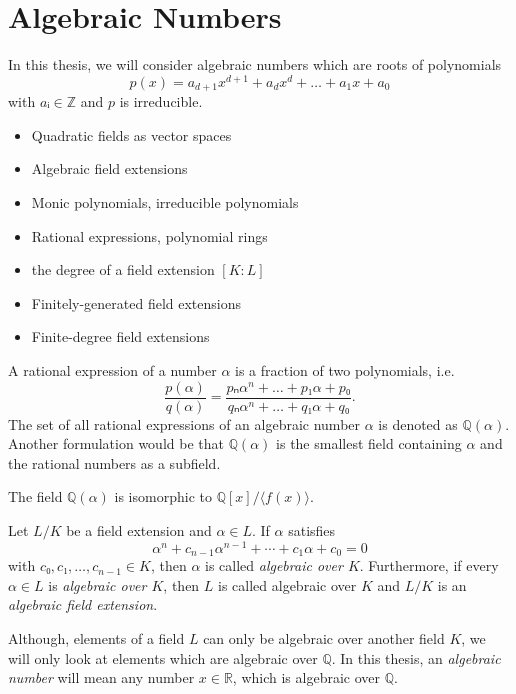 
\section{Algebraic Numbers}

In this thesis, we will consider algebraic numbers which are roots of polynomials
\[
  p(x) = a_{d+1} x^{d+1} + a_d x^d + \dots + a_1 x + a_0
\]
with $aᵢ ∈ ℤ$ and $p$ is irreducible.

\begin{itemize}
  \item Quadratic fields as vector spaces
  \item Algebraic field extensions
  \item Monic polynomials, irreducible polynomials
  \item Rational expressions, polynomial rings
  \item the degree of a field extension $[K : L]$
  \item Finitely-generated field extensions
  \item Finite-degree field extensions
\end{itemize}

A rational expression of a number $α$ is a fraction of two polynomials, i.e.
\[
  \frac{p(α)}{q(α)} = \frac{pₙ α^n + \dots + p₁ α + p₀}{qₙ α^n + \dots + q₁ α + q₀}.
\]
The set of all rational expressions of an algebraic number $α$ is denoted as $ℚ(α)$.
Another formulation would be that $ℚ(α)$ is the smallest field containing $α$
and the rational numbers as a subfield.

\begin{theorem}
  The field $ℚ(α)$ is isomorphic to $ℚ[x]/⟨f(x)⟩$.
\end{theorem}

\begin{definition}
  Let $L/K$ be a field extension and $α ∈ L$.
  If $α$ satisfies
  \[
    α^n + c_{n-1} α^{n-1} + ⋯ + c_1 α + c_0 = 0
  \]
  with $c₀, c₁, …, c_{n-1} ∈ K$,
  then $α$ is called \emph{algebraic over $K$}.
  Furthermore, if every $α ∈ L$ is \emph{algebraic over $K$}, then $L$ is called
  algebraic over $K$ and $L/K$ is an \emph{algebraic field extension}.
\end{definition}

Although, elements of a field $L$ can only be algebraic over another field $K$,
we will only look at elements which are algebraic over $ℚ$.
In this thesis, an \emph{algebraic number} will mean any number $x ∈ ℝ$, which
is algebraic over $ℚ$.

